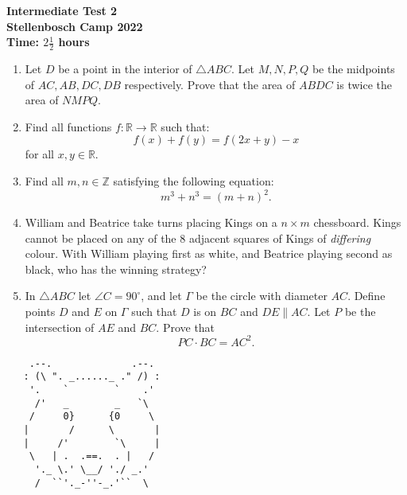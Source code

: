 \documentclass{article}
\begin{document}
\thispagestyle{empty}

\begin{center}
  \textbf{\Large Intermediate Test 2}
  \\ \vspace{1em}
  \textbf{\large Stellenbosch Camp 2022}
  \\ \vspace{1em}
  \textbf{\large Time: $2\frac{1}{2}$ hours}
\end{center}

\bigskip

\begin{enumerate}[itemsep=\fill]

\item %
Let $D$ be a point in the interior of $\triangle ABC$. Let $M,N,P,Q$ be the midpoints of $AC, AB, DC, DB$ respectively. Prove that the area of $ABDC$ is twice the area of $NMPQ$. 


\item %
Find all functions $f:\mathbb{R}\to\mathbb{R}$ such that:
\[f(x) + f(y) = f(2x+y) - x\] for all $x,y\in\mathbb{R}$.


\item %
Find all $m,n\in \mathbb{Z}$ satisfying the following equation:
\[m^3 + n^3 = (m+n)^2.\]


\vspace{0pt}
\item %
William and Beatrice take turns placing Kings on a $n \times m$ chessboard.
Kings cannot be placed on any of the 8 adjacent squares of Kings of \emph{differing} colour.
With William playing first as white, and Beatrice playing second as black, who has the winning strategy?


\item %
In $\triangle ABC$ let $\angle C = 90^\circ$, and let $\Gamma$ be the circle with diameter $AC$.
Define points $D$ and $E$ on $\Gamma$ such that $D$ is on $BC$ and $DE \parallel AC$.
Let $P$ be the intersection of $AE$ and $BC$.
Prove that
\[ PC \cdot BC = AC^2. \]

\end{enumerate}


\vfill
\centering
\small
\begin{BVerbatim}
    .--.              .--.
   : (\ ". _......_ ." /) :
    '.    `        `    .'
     /'   _        _   `\
    /     0}      {0     \
   |       /      \       |
   |     /'        `\     |
    \   | .  .==.  . |   /
     '._ \.' \__/ './ _.'
     /  ``'._-''-_.'``  \
\end{BVerbatim}
\end{document}
